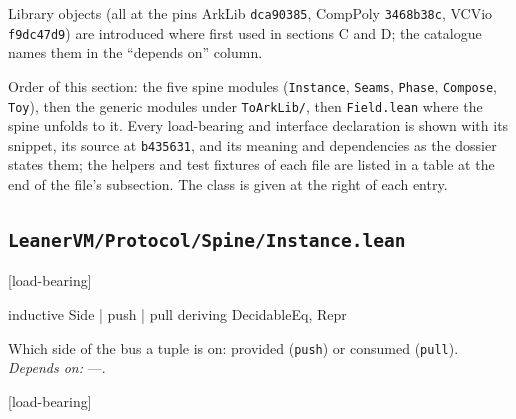 Library objects (all at the pins ArkLib \texttt{dca90385}, CompPoly \texttt{3468b38c}, VCVio \texttt{f9dc47d9}) are introduced where first used in sections C and D; the catalogue names them in the \enquote{depends on} column.

\par{}\par

Order of this section: the five spine modules (\texttt{Instance}, \texttt{Seams}, \texttt{Phase}, \texttt{Compose}, \texttt{Toy}), then the generic modules under \texttt{ToArkLib/}, then \texttt{Field.\allowbreak{}lean} where the spine unfolds to it. Every load-bearing and interface declaration is shown with its snippet, its source at \texttt{b435631}, and its meaning and dependencies as the dossier states them; the helpers and test fixtures of each file are listed in a table at the end of the file's subsection. The class is given at the right of each entry.

\subsection{\texttt{LeanerVM/Protocol/Spine/Instance.lean}}\label{sec:gen-cat-spine-Instance}

\par\medskip\noindent\textbf{}\hfill\textsf{\small [load-bearing]}\par\nopagebreak

\begin{leancode}
inductive Side
  | push
  | pull
  deriving DecidableEq, Repr
\end{leancode}


Which side of the bus a tuple is on: provided (\texttt{push}) or consumed (\texttt{pull}). \emph{Depends on:} —.

\par\medskip\noindent\textbf{}\hfill\textsf{\small [load-bearing]}\par\nopagebreak


